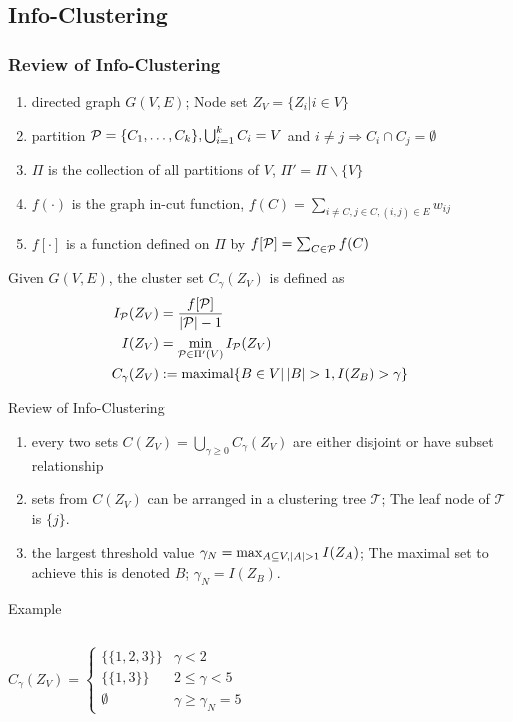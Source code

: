 \documentclass[notheorems]{beamer}
\begin{document}
\subsection{Info-Clustering}
\begin{frame}
\frametitle{Review of Info-Clustering}
\begin{enumerate}
\item directed graph $G(V, E)$; Node set $Z_V=\{Z_i | i \in V\}$
\item partition $\P=\{C_1, \dots, C_k\}, \bigcup_{i=1}^k C_i = V$ and $i\neq j \Rightarrow C_i \cap C_j = \emptyset$
\item $\Pi$ is the collection of all partitions of $V$, $\Pi' = \Pi \backslash \{V\}$
\item $f(\cdot)$ is the graph in-cut function, $f(C)=\sum_{i \neq C, j\in C, (i,j) \in E} w_{ij}$
\item $f[\cdot]$ is a function defined on $\Pi$ by $f[\P]=\sum_{C\in \P}f(C)$
\end{enumerate}
\begin{definition}
Given $G(V, E)$, the cluster set $C_{\gamma}(Z_V)$ is defined as 
\begin{align}
I_{\mathcal{P}}(Z_V) & = \frac{f[\P]}{ \abs{\mathcal{P}} - 1}\\
I(Z_V) & = \min_{\mathcal{P} \in \Pi'(V)} I_{\mathcal{P}}(Z_V) \\
C_{\gamma}(Z_V) & := \textrm{maximal}\{ B \in V \vert \, \abs{B} > 1, I(Z_B) > \gamma \}
\end{align}
\end{definition}
\end{frame}
\begin{frame}{Review of Info-Clustering}
\begin{enumerate}
\item  every two sets $C(Z_V)=\bigcup_{\gamma \geq 0} C_{\gamma}(Z_V)$ are either disjoint or have subset relationship
\item sets from $C(Z_V)$ can be arranged in a clustering tree $\mathcal{T}$; The leaf node of $\mathcal{T}$ is $\{j\}$.
\item the largest threshold value $\gamma_N = \max_{A\subseteq V, \abs{A}>1} I(Z_A)$; The maximal set to achieve this is denoted $B$; $\gamma_N = I(Z_B)$.
\end{enumerate}
Example
\begin{columns}
	\begin{equation*}
	C_{\gamma}(Z_V)	=\begin{cases}
					\{\{1,2,3\}\} & \gamma < 2 \\
					\{\{1,3\}\} & 2\leq \gamma < 5 \\
					\emptyset & \gamma \geq \gamma_N = 5
		\end{cases}
	\end{equation*}
\end{columns}
\end{frame}
\end{document}
